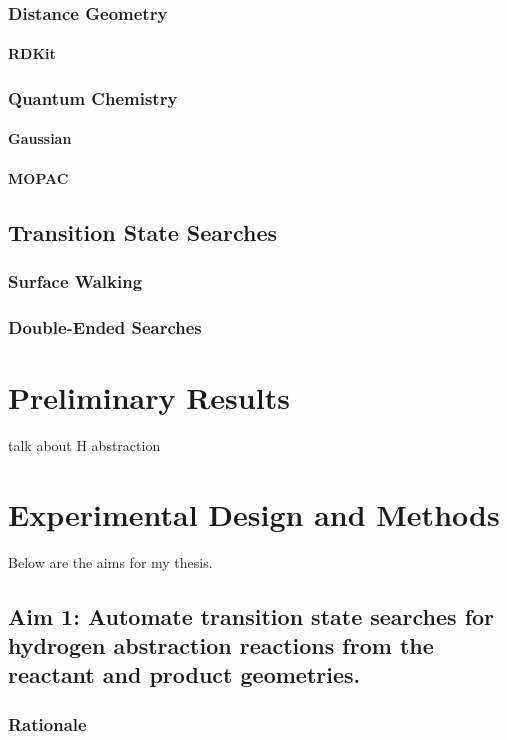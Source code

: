 \documentclass[12pt]{article}
\begin{document}
\subsubsection{Distance Geometry}
\paragraph{RDKit}
\subsubsection{Quantum Chemistry}
\paragraph{Gaussian}
\paragraph{MOPAC}
\subsection{Transition State Searches}
\subsubsection{Surface Walking}
\subsubsection{Double-Ended Searches}
\section{Preliminary Results}
talk about H abstraction

\section{Experimental Design and Methods}

Below are the aims for my thesis.

\subsection{Aim 1: Automate transition state searches for hydrogen abstraction reactions from the reactant and product geometries.}
\subsubsection{Rationale}
\end{document}

